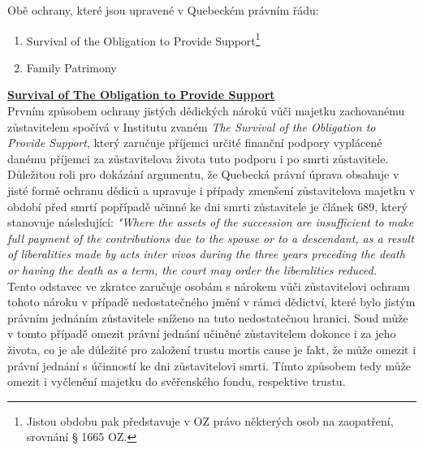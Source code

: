 \documentclass{article}
\begin{document}
\vspace{5 mm}

Obě ochrany, které jsou upravené v Quebeckém právním řádu:

\begin{enumerate}
\item Survival of the Obligation to Provide Support\footnote{Jistou obdobu pak představuje v OZ právo některých osob na zaopatření, srovnání § 1665 OZ.}
\item Family Patrimony	
\end{enumerate}


\vspace{5 mm}

\underline{\textbf{Survival of The Obligation to Provide Support}}\\

Prvním způsobem ochrany jistých dědických nároků vůči majetku zachované\-mu zůstavitelem spočívá v Institutu zvaném \textit{The Survival of the Obligation to Provide Support}, který zaručuje příjemci určité finanční podpory vyplácené danému příjemci za zůstavitelova života tuto podporu i po smrti zůstavitele. \\

Důležitou roli pro dokázání argumentu, že Quebecká právní úprava obsahuje v jisté formě ochranu dědiců a upravuje i případy zmenšení zůstavitelova majetku v období před smrtí popřípadě učinné ke dni smrti zůstavitele je článek 689, který stanovuje následující: \textit{"Where the assets of the succession are insufficient to make full payment of the contributions due to the spouse or to a descendant, as a result of liberalities made by acts inter vivos during the three years preceding the death or having the death as a term, the court may order the liberalities reduced.}\\ 

Tento odstavec ve zkratce zaručuje osobám s nárokem vůči zůstavitelovi ochranu tohoto nároku v případě nedostatečného jmění v rámci dědictví, které bylo jistým právním jednáním zůstavitele sníženo na tuto nedostatečnou hranici. Soud může v tomto případě omezit právní jednání učiněné zůstavitelem dokonce i za jeho života, co je ale důležité pro založení trustu mortis cause je fakt, že může omezit i právní jednání s účinností ke dni zůstavitelovi smrti. Tímto způsobem tedy může omezit i vyčlenění majetku do svěřenského fondu, respektive trustu. \\
\end{document}
